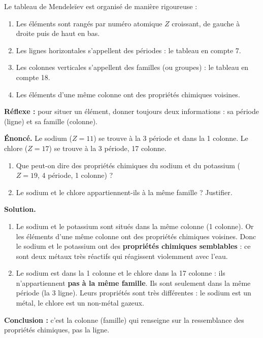 \documentclass[11pt]{article}
\newcommand{\cle}[1]{{\popxbold\color{popdark}#1}}
\begin{document}
\begin{methode}
Le tableau de Mendeleïev est organisé de manière rigoureuse :
\begin{enumerate}
\item Les éléments sont rangés par \cle{numéro atomique} $Z$ croissant, de gauche à droite puis de haut en bas.
\item Les \cle{lignes horizontales} s'appellent des \cle{périodes} : le tableau en compte 7.
\item Les \cle{colonnes verticales} s'appellent des \cle{familles} (ou groupes) : le tableau en compte 18.
\item Les éléments d'une même colonne ont des \cle{propriétés chimiques voisines}.
\end{enumerate}
\textbf{Réflexe :} pour situer un élément, donner toujours deux informations : sa période (ligne) et sa famille (colonne).
\end{methode}

\begin{exoresolu}
\textbf{Énoncé.} Le sodium  ($Z = 11$) se trouve à la 3 période et dans la 1 colonne. Le chlore  ($Z = 17$) se trouve à la 3 période, 17 colonne.
\begin{enumerate}
\item Que peut-on dire des propriétés chimiques du sodium et du potassium  ($Z = 19$, 4 période, 1 colonne) ?
\item Le sodium et le chlore appartiennent-ils à la même famille ? Justifier.
\end{enumerate}
\tcblower
\textbf{Solution.}
\begin{enumerate}
\item Le sodium  et le potassium  sont situés dans la \cle{même colonne} (1 colonne). Or les éléments d'une même colonne ont des propriétés chimiques voisines. Donc le sodium et le potassium ont des \textbf{propriétés chimiques semblables} : ce sont deux métaux très réactifs qui réagissent violemment avec l'eau.
\item Le sodium est dans la 1 colonne et le chlore dans la 17 colonne : ils n'appartiennent \textbf{pas à la même famille}. Ils sont seulement dans la même \cle{période} (la 3 ligne). Leurs propriétés sont très différentes : le sodium est un métal, le chlore est un non-métal gazeux.
\end{enumerate}
\textbf{Conclusion :} c'est la colonne (famille) qui renseigne sur la ressemblance des propriétés chimiques, pas la ligne.
\end{exoresolu}
\end{document}
